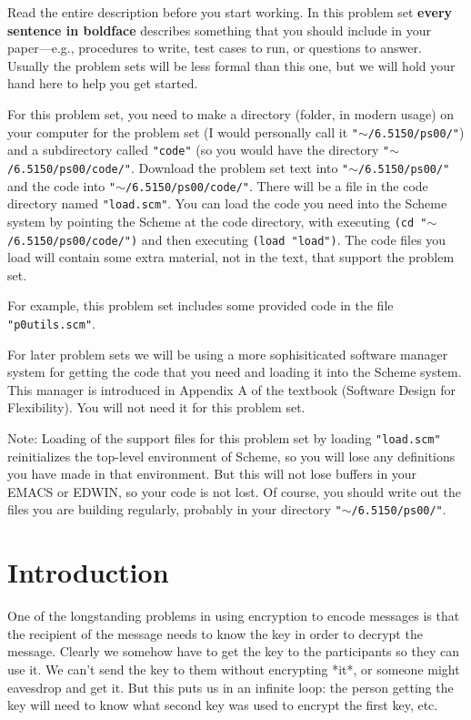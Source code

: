 Read the entire description before you start working.  In this problem
set {\bf every sentence in boldface} describes something that you
should include in your paper---e.g., procedures to write, test cases
to run, or questions to answer.  Usually the problem sets will be less
formal than this one, but we will hold your hand here to help you get
started.

For this problem set, you need to make a directory (folder, in modern
usage) on your computer for the problem set (I would personally call
it {\tt "$\sim$/6.5150/ps00/"}) and a subdirectory called {\tt "code"}
(so you would have the directory {\tt "$\sim$/6.5150/ps00/code/"}.
Download the problem set text into {\tt "$\sim$/6.5150/ps00/"} and the
code into {\tt "$\sim$/6.5150/ps00/code/"}.  There will be a file in
the code directory named {\tt "load.scm"}.  You can load the code you
need into the Scheme system by pointing the Scheme at the code
directory, with executing {\tt (cd "$\sim$/6.5150/ps00/code/")} and
then executing {\tt (load "load")}.  The code files you load will
contain some extra material, not in the text, that support the problem
set.

For example, this problem set includes some provided code in the file
{\tt "p0utils.scm"}.

For later problem sets we will be using a more sophisiticated software
manager system for getting the code that you need and loading it into
the Scheme system.  This manager is introduced in Appendix A of the
textbook (Software Design for Flexibility).  You will not need it for
this problem set.


Note: Loading of the support files for this problem set by loading
{\tt "load.scm"} reinitializes the top-level environment of Scheme, so you
will lose any definitions you have made in that environment.  But this
will not lose buffers in your EMACS or EDWIN, so your code is not
lost.  Of course, you should write out the files you are building
regularly, probably in your directory {\tt "$\sim$/6.5150/ps00/"}.




\newpage

\section*{Introduction}

One of the longstanding problems in using encryption to encode
messages is that the recipient of the message needs to know the key in
order to decrypt the message. Clearly we somehow have to get the key
to the participants so they can use it.  We can't send the key to them
without encrypting *it*, or someone might eavesdrop and get it.  But
this puts us in an infinite loop: the person getting the key will need
to know what second key was used to encrypt the first key, etc.

